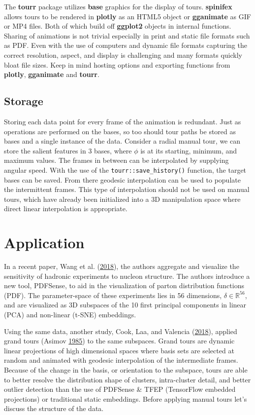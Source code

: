 The \textbf{tourr} package utilizes \textbf{base} graphics for the
display of tours. \textbf{spinifex} allows tours to be rendered in
\textbf{plotly} as an HTML5 object or \textbf{gganimate} as GIF or MP4
files. Both of which build off \textbf{ggplot2} objects in internal
functions. Sharing of animations is not trivial especially in print and
static file formats such as PDF. Even with the use of computers and
dynamic file formats capturing the correct resolution, aspect, and
display is challenging and many formats quickly bloat file sizes. Keep
in mind hosting options and exporting functions from \textbf{plotly},
\textbf{gganimate} and \textbf{tourr}.

\hypertarget{storage}{%
\subsection{Storage}\label{storage}}

Storing each data point for every frame of the animation is redundant.
Just as operations are performed on the bases, so too should tour paths
be stored as bases and a single instance of the data. Consider a radial
manual tour, we can store the salient features in 3 bases, where
\(\phi\) is at its starting, minimum, and maximum values. The frames in
between can be interpolated by supplying angular speed. With the use of
the \texttt{tourr::save\_history()} function, the target bases can be
saved. From there geodesic interpolation can be used to populate the
intermittent frames. This type of interpolation should not be used on
manual tours, which have already been initialized into a 3D manipulation
space where direct linear interpolation is appropriate.

\hypertarget{sec:application}{%
\section{Application}\label{sec:application}}

In a recent paper, Wang et al.
(\protect\hyperlink{ref-wang_mapping_2018}{2018}), the authors aggregate
and visualize the sensitivity of hadronic experiments to nucleon
structure. The authors introduce a new tool, PDFSense, to aid in the
visualization of parton distribution functions (PDF). The
parameter-space of these experiments lies in 56 dimensions,
\(\delta \in \mathbb{R}^{56}\), and are visualized as 3D subspaces of
the 10 first principal components in linear (PCA) and non-linear (t-SNE)
embeddings.

Using the same data, another study, Cook, Laa, and Valencia
(\protect\hyperlink{ref-cook_dynamical_2018}{2018}), applied grand tours
(Asimov \protect\hyperlink{ref-asimov_grand_1985}{1985}) to the same
subspaces. Grand tours are dynamic linear projections of high
dimensional spaces where basis sets are selected at random and animated
with geodesic interpolation of the intermediate frames. Because of the
change in the basis, or orientation to the subspace, tours are able to
better resolve the distribution shape of clusters, intra-cluster detail,
and better outlier detection than the use of PDFSense \& TFEP
(TensorFlow embedded projections) or traditional static embeddings.
Before applying manual tours let's discuss the structure of the data.

